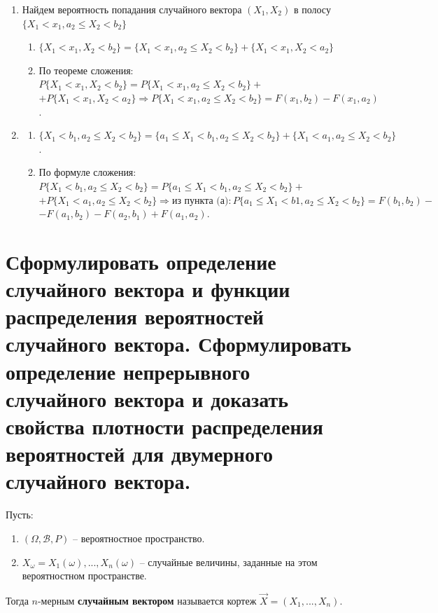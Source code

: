 \begin{enumerate}[label=(\alph*)]
	\item Найдем вероятность попадания случайного вектора $(X_1, X_2)$ в полосу $\{X_1 < x_1, a_2 \leq X_2 < b_2\}$
	
	\begin{enumerate}[label=\arabic*.]
		\item $\{X_1 < x_1, X_2 < b_2\} = \{X_1 < x_1, a_2 \leq X_2 < b_2\} + \{X_1 < x_1, X_2 < a_2\}$
		
		\item По теореме сложения: $P\{X_1 < x_1, X_2 < b_2\} = P\{X_1 < x_1, a_2 \leq X_2 < b_2 \} +$\newline$+P\{X_1 < x_1, X_2 < a_2\} \Rightarrow P\{X_1<x_1,a_2\leq X_2<b_2\} = F(x_1, b_2) - F(x_1, a_2)$.
	\end{enumerate}
	
	\item \begin{enumerate}[label=\arabic*.]
		\item $\{X_1 < b_1, a_2 
		\leq X_2 <b_2\} = \{a_1 \leq X_1 < b_1, a_2 \leq X_2 < b_2\} + \{X_1 < a_1, a_2 \leq X_2 < b_2\}$.
		
		\item По формуле сложения: $P\{X_1 < b_1, a_2 \leq X_2 < b_2\} = P\{a_1 \leq X_1 < b_1, a_2 \leq X_2 < b_2\} +$ 
		\newline$+P\{X_1 < a_1, a_2 \leq X_2 < b_2\} \Rightarrow \text{из пункта (а)}: P\{a_1 \leq X_1 < b1, a_2 \leq X_2 < b_2\} =  F(b_1, b_2) -$ $-F(a_1, b_2)-F(a_2, b_1) + F(a_1, a_2)$.
	\end{enumerate}
	
\end{enumerate}



\section{Сформулировать определение случайного вектора и функции распределения вероятностей случайного вектора. Сформулировать определение непрерывного случайного вектора и доказать свойства плотности распределения вероятностей для двумерного случайного вектора.}

Пусть: 
\begin{enumerate}
	\item $(\Omega, \mathcal{B}, P)$ -- вероятностное пространство.
	
	\item $X_{\omega} = X_1(\omega),...,X_n(\omega)$ -- случайные величины, заданные на этом вероятностном пространстве.
\end{enumerate}
Тогда $n$-мерным \textbf{случайным вектором} называется кортеж $\vec{X} = (X_1,..., X_n)$.

